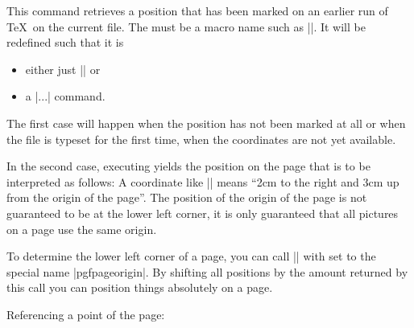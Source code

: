 \begin{command}{\pgfsys@getposition{}}
    This command retrieves a position that has been marked on an earlier run of
    \TeX\ on the current file. The  must be a macro name such as
    |\mymacro|. It will be redefined such that it is
    \begin{itemize}
        \item either just |\relax| or
        \item a |\pgfpoint...| command.
    \end{itemize}
    The first case will happen when the position has not been marked at all or
    when the file is typeset for the first time, when the coordinates are not
    yet available.

    In the second case, executing  yields the position on the page
    that is to be interpreted as follows: A coordinate like
    |\pgfpoint{2cm}{3cm}| means ``2cm to the right and 3cm up from the origin
    of the page''. The position of the origin of the page is not guaranteed to
    be at the lower left corner, it is only guaranteed that all pictures on a
    page use the same origin.

    To determine the lower left corner of a page, you can call
    |\pgfsys@getposition| with  set to the special name
    |pgfpageorigin|. By shifting all positions by the amount returned by this
    call you can position things absolutely on a page.

    \example Referencing a point of the page:
\end{command}


